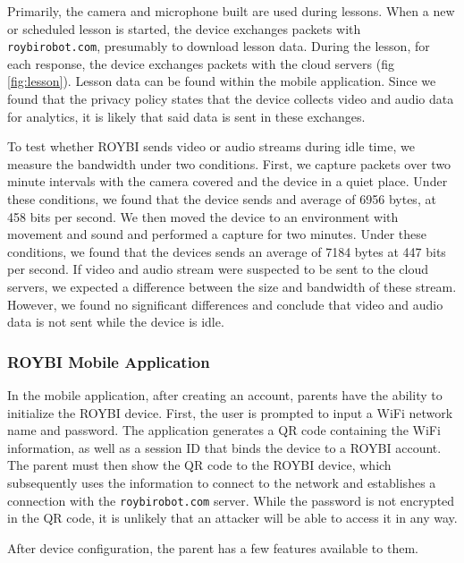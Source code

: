 \documentclass[12pt]{ucthesis}
\begin{document}
Primarily, the camera and microphone built are used during lessons. When a new or scheduled lesson is started, the device exchanges packets with \texttt{roybirobot.com}, presumably to download lesson data. During the lesson, for each response, the device exchanges packets with the cloud servers (fig \ref{fig:lesson}). Lesson data can be found within the mobile application. Since we found that the privacy policy states that the device collects video and audio data for analytics, it is likely that said data is sent in these exchanges.

To test whether ROYBI sends video or audio streams during idle time, we measure the bandwidth under two conditions. First, we capture packets over two minute intervals with the camera covered and the device in a quiet place. Under these conditions, we found that the device sends and average of 6956 bytes, at 458 bits per second. We then moved the device to an environment with movement and sound and performed a capture for two minutes. Under these conditions, we found that the devices sends an average of 7184 bytes at 447 bits per second. If video and audio stream were suspected to be sent to the cloud servers, we expected a difference between the size and bandwidth of these stream. However, we found no significant differences and conclude that video and audio data is not sent while the device is idle.

\subsubsection{ROYBI Mobile Application}
In the mobile application, after creating an account, parents have the ability to initialize the ROYBI device. First, the user is prompted to input a WiFi network name and password. The application generates a QR code containing the WiFi information, as well as a session ID that binds the device to a ROYBI account. The parent must then show the QR code to the ROYBI device, which subsequently uses the information to connect to the network and establishes a connection with the \texttt{roybirobot.com} server. While the password is not encrypted in the QR code, it is unlikely that an attacker will be able to access it in any way.

After device configuration, the parent has a few features available to them.
\end{document}

